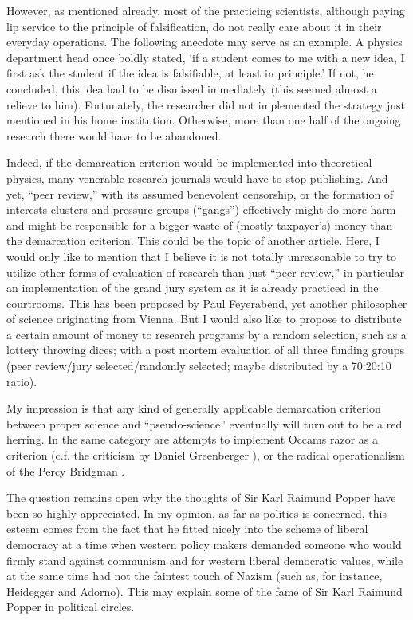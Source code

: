 However, as mentioned already, most of the practicing scientists,
although paying lip service to the principle of falsification,
do not really care about it in their everyday operations.
The following anecdote may serve as an example.
A physics department head once boldly stated,
`if a student comes to me with a new idea, I first ask the student
if the idea is falsifiable, at least in principle.'
If not, he concluded, this idea had to be dismissed immediately
(this seemed almost a relieve to him).
Fortunately, the researcher did not implemented the strategy
just mentioned in his home institution.
Otherwise, more than one half of the ongoing research there would have to be abandoned.

Indeed, if the demarcation criterion would be implemented into theoretical physics,
many venerable research journals would have to stop publishing.
And yet, ``peer review,'' with its assumed benevolent
censorship, or the formation of interests clusters and pressure groups
(``gangs'') effectively might do more harm and might be responsible for
a bigger waste of
(mostly taxpayer's) money than the demarcation criterion.
This could be
the topic of another
article.
Here, I would only like to mention that I believe it is not totally unreasonable to try to utilize
other forms of evaluation of research than just ``peer review,''
in particular an implementation of the grand jury system as it is
already practiced
in the courtrooms. This has been proposed by Paul Feyerabend, yet
another philosopher of science originating from Vienna. But I would
also like to propose
to distribute a certain amount of money to research programs by a random
selection, such as a lottery throwing dices; with a post mortem
evaluation of all three funding groups
(peer review/jury selected/randomly selected; maybe distributed by a
70:20:10 ratio).

My impression is that any kind of generally applicable
demarcation criterion between
proper science and ``pseudo-science'' eventually will turn out to be a
red herring.
In the same category are attempts to implement Occams razor as
a criterion (c.f. the criticism by Daniel Greenberger
\cite{greenberger-occamsrazor}),
or the radical operationalism of the Percy Bridgman \cite{bridgman36}.


The question remains open
why the thoughts of Sir Karl Raimund Popper have been so highly appreciated.
In my opinion, as far as politics is concerned, this esteem comes from the fact that he fitted nicely
into the scheme of liberal democracy at a time when western policy
makers demanded someone who would firmly stand against communism and for western liberal democratic values,
 while at the same time
had not the faintest touch of Nazism (such as, for instance, Heidegger and Adorno).
This may explain some of the fame of Sir Karl Raimund Popper in
political circles.

